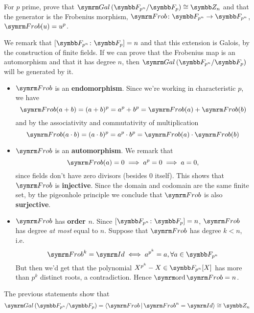 \begin{exercise}
For \(p\) prime, prove that \(\Gal{\finitefield{p^n}}{\finitefield{p}} \cong \integersmod{n}\) and that the generator is the Frobenius morphism, \(\Frob \colon \finitefield{p^n} \to \finitefield{p^n}\), \(\Frob(u) = u^p\).
\end{exercise}
\begin{solution}
We remark that \(\degree{\finitefield{p^n}}{\finitefield{p}} = n\) and that this extension is Galois, by the construction of finite fields. If we can prove that the Frobenius map is an automorphism and that it has degree \(n\), then \(\Gal{\finitefield{p^n}}{\finitefield{p}}\) will be generated by it.

\begin{itemize}
    \item \(\Frob\) is an \textbf{endomorphism}. Since we're working in characteristic \(p\), we have
    \[
        \Frob(a + b) = (a + b)^p = a^p + b^p = \Frob(a) + \Frob(b)
    \]
    and by the associativity and commutativity of multiplication
    \[
        \Frob(a \cdot b) = (a \cdot b)^p = a^p \cdot b^p = \Frob(a) \cdot \Frob(b)
    \]
    
    \item \(\Frob\) is an \textbf{automorphism}. We remark that
    \[
        \Frob(a) = 0 \implies a^p = 0 \implies a = 0,
    \]
    since fields don't have zero divisors (besides \(0\) itself). This shows that \(\Frob\) is \textbf{injective}. Since the domain and codomain are the same finite set, by the pigeonhole principle we conclude that \(\Frob\) is also \textbf{surjective}.

    \item \(\Frob\) has \textbf{order \(n\)}. Since \(\degree{\finitefield{p^n}}{\finitefield{p}} = n\), \(\Frob\) has degree \emph{at most} equal to \(n\). Suppose that \(\Frob\) has degree \(k < n\), i.e.
    \[
        \Frob^k = \Id \iff a^{p^k} = a, \forall a \in \finitefield{p^n}
    \]
    But then we'd get that the polynomial \(X^{p^k} - X \in \finitefield{p^n}[X]\) has more than \(p^k\) distinct roots, a contradiction. Hence \(\ord \Frob = n\).
\end{itemize}

The previous statements show that
\[
    \Gal{\finitefield{p^n}}{\finitefield{p}} = \generatedby{ \Frob \vbar \Frob^n = \Id } \cong \integersmod{n}
\]
\end{solution}

